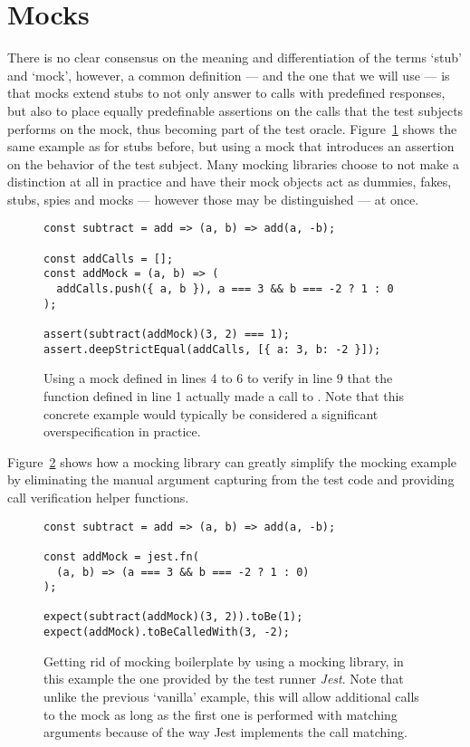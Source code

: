 \section{Mocks}
There is no clear consensus on the meaning and differentiation
of the terms `stub' and `mock', however, a common definition
--- and the one that we will use ---
is that mocks extend stubs to
not only answer to calls with predefined responses,
but also to place equally predefinable assertions on
the calls that the test subjects performs on the mock,
\autocite{MocksArentStubs}
thus becoming part of the test oracle.
Figure~\ref{fig:Mock} shows the same example as for stubs before,
but using a mock that introduces an assertion
on the behavior of the test subject.
Many mocking libraries choose to
not make a distinction at all in practice
and have their mock objects act as
dummies, fakes, stubs, spies and mocks
--- however those may be distinguished --- at once.
\autocite{SpockFrameworkDoc}\autocite{JestMockFunctions}

\begin{figure}
  \begin{verbatim}
const subtract = add => (a, b) => add(a, -b);

const addCalls = [];
const addMock = (a, b) => (
  addCalls.push({ a, b }), a === 3 && b === -2 ? 1 : 0
);

assert(subtract(addMock)(3, 2) === 1);
assert.deepStrictEqual(addCalls, [{ a: 3, b: -2 }]);
  \end{verbatim}
  \caption{
    Using a mock defined in lines 4 to 6
    to verify in line 9
    that the  function defined in line 1
    actually made a call to .
    Note that this concrete example would typically be considered
    a significant overspecification in practice.
  }\label{fig:Mock}
\end{figure}

Figure~\ref{fig:MockLibrary} shows how a mocking library
can greatly simplify the mocking example
by eliminating the manual argument capturing from the test code
and providing call verification helper functions.

\begin{figure}
  \begin{verbatim}
const subtract = add => (a, b) => add(a, -b);

const addMock = jest.fn(
  (a, b) => (a === 3 && b === -2 ? 1 : 0)
);

expect(subtract(addMock)(3, 2)).toBe(1);
expect(addMock).toBeCalledWith(3, -2);
  \end{verbatim}
  \caption{
    Getting rid of mocking boilerplate by using a mocking library,
    in this example the one provided by the test runner \textit{Jest}.
    \autocite{JestGithub}
    Note that unlike the previous `vanilla' example,
    this will allow additional calls to the mock
    as long as the first one is performed with matching arguments
    because of the way Jest implements the call matching.
  }\label{fig:MockLibrary}
\end{figure}
